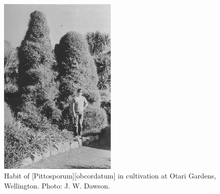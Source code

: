 \begin{figure}
	\includegraphics[width=0.5\textwidth]{graphics/figure75pittosporum.jpg}
	\centering
	\caption[Habit of \emph{Pittosporum obcordatum}]{Habit of [Pittosporum][obcordatum] in cultivation at Otari Gardens, Wellington.
	Photo: J. W. Dawson.}%
	\label{fig:75pittosporum}
\end{figure}

